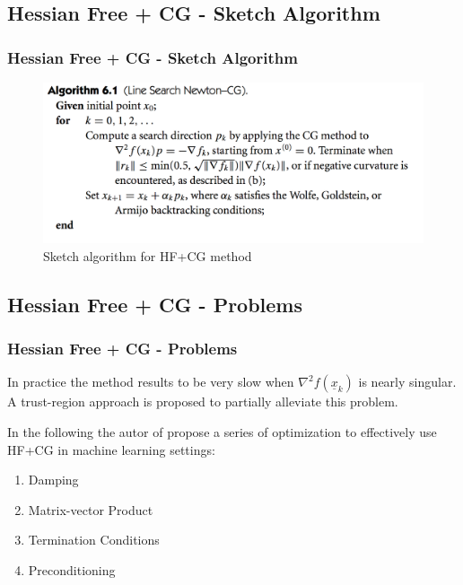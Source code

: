 \documentclass[professionalfont]{beamer}
\begin{document}
  \subsection{Hessian Free + CG - Sketch Algorithm}
  \begin{frame}
    \frametitle{Hessian Free + CG - Sketch Algorithm}
    \begin{figure}
      \centering
      \includegraphics[scale=0.4]{algorithm.png}
      \caption{Sketch algorithm for HF+CG method}
      \label{}
    \end{figure}

  \end{frame}

  \subsection{Hessian Free + CG - Problems}
  \begin{frame}
    \frametitle{Hessian Free + CG - Problems}
    In practice the method results to be very slow when $\nabla^2 f(\underline{x}_k)$ is nearly
    singular. A trust-region approach is proposed to partially alleviate this problem.\newline\newline

    In the following the autor of \cite{martens} propose a series of optimization to effectively use HF+CG in
    machine learning settings:
    \begin{enumerate}
      \item Damping
      \item Matrix-vector Product
      \item Termination Conditions
      \item Preconditioning
    \end{enumerate}
  \end{frame}
\end{document}
